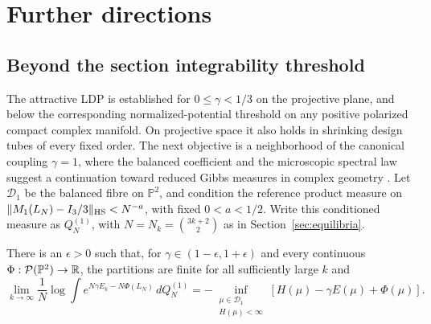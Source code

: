 \section{Further directions}
\label{sec:future}

\subsection{Beyond the section integrability threshold}

The attractive LDP is established for $0\le\gamma<1/3$ on the projective
plane, and below the corresponding normalized-potential threshold on any
positive polarized compact complex manifold. On projective space it also
holds in shrinking design tubes of every fixed order. The next objective
is a neighborhood of the canonical coupling $\gamma=1$, where the balanced
coefficient and the microscopic spectral law suggest a continuation toward
reduced Gibbs measures in complex geometry
\citep{AndreassonBermanSvensson2026}. Let $\mathcal D_1$ be the balanced
fibre on $\mathbb P^2$, and condition the reference product measure on
$\|M_1(L_N)-I_3/3\|_{\rm HS}<N^{-a}$, with fixed $0<a<1/2$.
Write this conditioned measure as $Q_N^{(1)}$, with
$N=N_k=\binom{3k+2}{2}$ as in Section~\ref{sec:equilibria}.

\begin{conjecture}
\label{conj:attractive}
There is an $\epsilon>0$ such that, for
$\gamma\in(1-\epsilon,1+\epsilon)$ and every continuous
$\Phi:\mathcal P(\mathbb P^2)\to\mathbb R$, the partitions are finite for
all sufficiently large $k$ and
\begin{equation}
 \lim_{k\to\infty}\frac1N\log
 \int e^{N\gamma E_k-N\Phi(L_N)}\,dQ_N^{(1)}
 =-\inf_{\substack{\mu\in\mathcal D_1\\H(\mu)<\infty}}
       [H(\mu)-\gamma E(\mu)+\Phi(\mu)].
 \label{eq:attractive-target}
\end{equation}
\end{conjecture}

